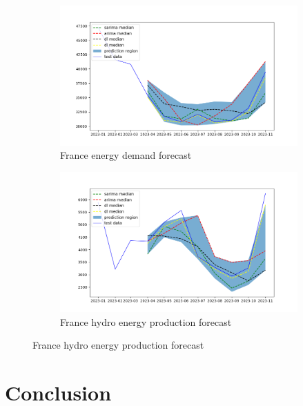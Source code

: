 \documentclass[acmtog]{acmart}
\begin{document}
\begin{figure}[htbp]
    \centering
    \begin{subfigure}{0.3\textwidth}
        \centering
        \includegraphics[width=\textwidth]{figures/Figure_5.png}
        \caption{France energy demand forecast}
        \label{fig:3sub1}
    \end{subfigure}
    \hfill
    \begin{subfigure}{0.3\textwidth}
        \centering
        \includegraphics[width=\textwidth]{figures/Figure_6.png}
        \caption{France hydro energy production forecast}
        \label{fig:3sub2}
    \end{subfigure}
    \label{fig:demand_hydro_forecast}
\end{figure}

\section{Conclusion}
\end{document}
